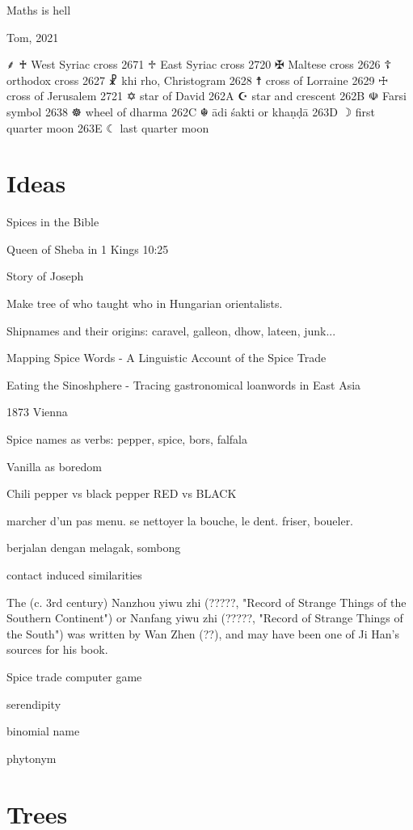 \epigraph{Maths is hell}{Tom, 2021}

⸙
♰ West Syriac cross
2671 ♱ East Syriac cross
2720 ✠ Maltese cross
2626 ☦ orthodox cross
2627 ☧ khi rho, Christogram
2628 ☨ cross of Lorraine
2629 ☩ cross of Jerusalem
2721 ✡ star of David
262A ☪ star and crescent
262B ☫ Farsi symbol
2638 ☸ wheel of dharma
262C ☬ ādi śakti or khaṇḍā
263D ☽ first quarter moon
263E ☾ last quarter moon

\blindtext

\section{Ideas}

Spices in the Bible

Queen of Sheba in 1 Kings 10:25

Story of Joseph 

Make tree of who taught who in Hungarian orientalists.

Shipnames and their origins: caravel, galleon, dhow, lateen, junk...

Mapping Spice Words - A Linguistic Account of the Spice Trade

Eating the Sinoshphere - Tracing gastronomical loanwords in East Asia

1873 Vienna

Spice names as verbs: pepper, spice, bors, falfala

Vanilla as boredom

Chili pepper vs black pepper RED vs BLACK

marcher d'un pas menu.
se nettoyer la bouche, le dent.
friser, boueler.

berjalan dengan melagak, sombong

contact induced similarities

The (c. 3rd century) Nanzhou yiwu zhi (?????, "Record of Strange Things of the Southern Continent") or Nanfang yiwu zhi (?????, "Record of Strange Things of the South") was written by Wan Zhen (??), and may have been one of Ji Han's sources for his book. 

Spice trade computer game 

serendipity

binomial name

phytonym

\section{Trees}

